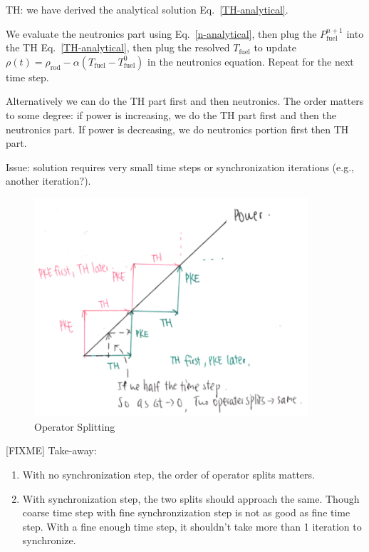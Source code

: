 \documentclass{school-22.211-notes}
\begin{document}
TH: we have derived the analytical solution Eq.~\ref{TH-analytical}.


We evaluate the neutronics part using Eq.~\ref{n-analytical}, then plug the $P_{\mathrm{fuel}}^{n+1}$ into the TH Eq.~\ref{TH-analytical}, then plug the resolved $T_{\mathrm{fuel}}$ to update $\rho(t) = \rho_{\mathrm{rod}} - \alpha (T_{\mathrm{fuel}} - T_{\mathrm{fuel}}^0)$ in the neutronics equation. Repeat for the next time step. 

Alternatively we can do the TH part first and then neutronics. The order matters to some degree: if power is increasing, we do the TH part first and then the neutronics part. If power is decreasing, we do neutronics portion first then TH part. 

Issue: solution requires very small time steps or synchronization iterations (e.g., another iteration?). 

\begin{figure}[ht]
  \centering
  \includegraphics[width=4in]{images/methd/operator-split.png}
  \caption{Operator Splitting}
\end{figure}


[FIXME]
Take-away: 
\begin{enumerate}
\item With no synchronization step, the order of operator splits matters. 
\item With synchronization step, the two splits should approach the same. Though coarse time step with fine synchronzization step is not as good as fine time step. With a fine enough time step, it shouldn't take more than 1 iteration to synchronize. 
\end{enumerate}
\end{document}
